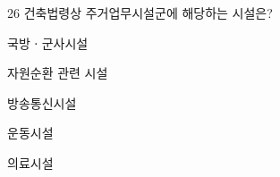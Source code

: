 \begin{question}{26}
건축법령상 주거업무시설군에 해당하는 시설은?
\begin{choices}
  \item 국방ㆍ군사시설
  \item 자원순환 관련 시설
  \item 방송통신시설
  \item 운동시설
  \item 의료시설
\end{choices}
\end{question}
